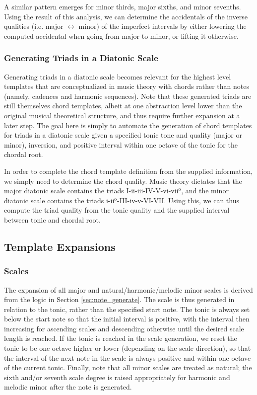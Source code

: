 \documentclass{article}
\begin{document}
A similar pattern emerges for minor thirds, major sixths, and minor sevenths. Using the result of this analysis, we can determine the accidentals of the inverse qualities (i.e. major $\leftrightarrow$ minor) of the imperfect intervals by either lowering the computed accidental when going from major to minor, or lifting it otherwise.  %

\subsubsection{Generating Triads in a Diatonic Scale}
\label{sec:chord_generate}
Generating triads in a diatonic scale becomes relevant for the highest level templates that are conceptualized in music theory with chords rather than notes (namely, cadences and harmonic sequences). Note that these generated triads are still themselves chord templates, albeit at one abstraction level lower than the original musical theoretical structure, and thus require further expansion at a later step. The goal here is simply to automate the generation of chord templates for triads in a diatonic scale given a specified tonic tone and quality (major or minor), inversion, and positive interval within one octave of the tonic for the chordal root. 

In order to complete the chord template definition from the supplied information, we simply need to determine the chord quality. Music theory dictates that the major diatonic scale contains the triads I-ii-iii-IV-V-vi-vii$^\text{o}$, and the minor diatonic scale contains the triads i-ii$^\text{o}$-III-iv-v-VI-VII. Using this, we can thus compute the triad quality from the tonic quality and the supplied interval between tonic and chordal root.

\subsection{Template Expansions}
\subsubsection{Scales}
The expansion of all major and natural/harmonic/melodic minor scales is derived from the logic in Section \ref{sec:note_generate}. The scale is thus generated in relation to the tonic, rather than the specified start note. The tonic is always set below the start note so that the initial interval is positive, with the interval then increasing for ascending scales and descending otherwise until the desired scale length is reached. If the tonic is reached in the scale generation, we reset the tonic to be one octave higher or lower (depending on the scale direction), so that the interval of the next note in the scale is always positive and within one octave of the current tonic. Finally, note that all minor scales are treated as natural; the sixth and/or seventh scale degree is raised appropriately for harmonic and melodic minor after the note is generated. 
\end{document}

